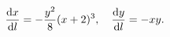 \begin{align}
    \frac{\mathrm d x}{\mathrm d l} = -\frac{y^2}8(x+2)^3,
    \quad
    \frac{\mathrm d y}{\mathrm d l} = - xy.
\end{align}
\begin{figure}
    \centering

\end{figure}
